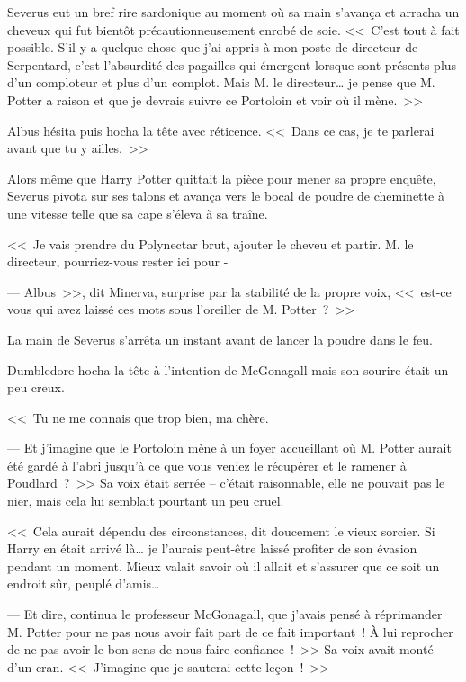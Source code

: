 Severus eut un bref rire sardonique au moment où sa main s'avança et arracha un cheveux qui fut bientôt précautionneusement enrobé de soie. <<~C'est tout à fait possible. S'il y a quelque chose que j'ai appris à mon poste de directeur de Serpentard, c'est l'absurdité des pagailles qui émergent lorsque sont présents plus d'un comploteur et plus d'un complot. Mais M. le directeur… je pense que M. Potter a raison et que je devrais suivre ce Portoloin et voir où il mène.~>>

Albus hésita puis hocha la tête avec réticence. <<~Dans ce cas, je te parlerai avant que tu y ailles.~>>

\later

Alors même que Harry Potter quittait la pièce pour mener sa propre enquête, Severus pivota sur ses talons et avança vers le bocal de poudre de cheminette à une vitesse telle que sa cape s'éleva à sa traîne.

<<~Je vais prendre du Polynectar brut, ajouter le cheveu et partir. M. le directeur, pourriez-vous rester ici pour -

--- Albus~>>, dit Minerva, surprise par la stabilité de la propre voix, <<~est-ce vous qui avez laissé ces mots sous l'oreiller de M. Potter~?~>>

La main de Severus s'arrêta un instant avant de lancer la poudre dans le feu.

Dumbledore hocha la tête à l'intention de McGonagall mais son sourire était un peu creux.

<<~Tu ne me connais que trop bien, ma chère.

--- Et j'imagine que le Portoloin mène à un foyer accueillant où M. Potter aurait été gardé à l'abri jusqu'à ce que vous veniez le récupérer et le ramener à Poudlard~?~>> Sa voix était serrée -- c'était raisonnable, elle ne pouvait pas le nier, mais cela lui semblait pourtant un peu cruel.

<<~Cela aurait dépendu des circonstances, dit doucement le vieux sorcier. Si Harry en était arrivé là… je l'aurais peut-être laissé profiter de son évasion pendant un moment. Mieux valait savoir où il allait et s'assurer que ce soit un endroit sûr, peuplé d'amis…

--- Et dire, continua le professeur McGonagall, que j'avais pensé à réprimander M. Potter pour ne pas nous avoir fait part de ce fait important~! À lui reprocher de ne pas avoir le bon sens de nous faire confiance~!~>> Sa voix avait monté d'un cran. <<~J'imagine que je sauterai cette leçon~!~>>

